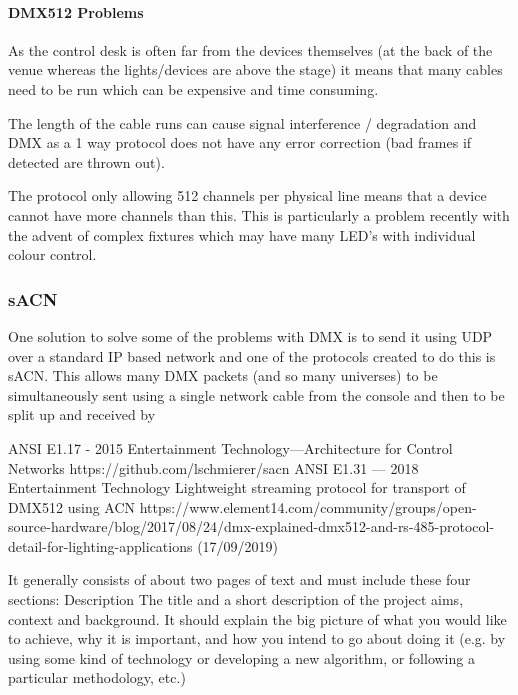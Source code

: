 \documentclass[12pt,a4paper,notitlepage]{report}
\begin{document}
\paragraph*{DMX512 Problems}
\begin{list}{}{}
	\item As the control desk is often far from the devices themselves (at the back of the venue whereas the lights/devices are above the stage) it means that many cables need to be run which can be expensive and time consuming.
	\item The length of the cable runs can cause signal interference / degradation and DMX as a 1 way protocol does not have any error correction (bad frames if detected are thrown out).
	\item The protocol only allowing 512 channels per physical line means that a device cannot have more channels than this. This is particularly a problem recently with the advent of complex fixtures which may have many LED's with individual colour control.
\end{list}

\subsubsection*{sACN}
One solution to solve some of the problems with DMX is to send it using UDP over a standard IP based network and one of the protocols created to do this is sACN. This allows many DMX packets (and so many universes) to be simultaneously sent using a single network cable from the console and then to be split up and received by 

	
\begin{thebibliography}{9}
	ANSI E1.17 - 2015 Entertainment Technology—Architecture for Control Networks
	https://github.com/lschmierer/sacn
	ANSI E1.31 — 2018 Entertainment Technology Lightweight streaming protocol for transport of DMX512 using ACN
	https://www.element14.com/community/groups/open-source-hardware/blog/2017/08/24/dmx-explained-dmx512-and-rs-485-protocol-detail-for-lighting-applications (17/09/2019)
	
\end{thebibliography}
	
	
 It
generally consists of about two pages of text and must include these four sections:
Description
The title and a short description of the project aims,
context and background. It should explain the big
picture of what you would like to achieve, why it is
important, and how you intend to go about doing it (e.g.
by using some kind of technology or developing a new
algorithm, or following a particular methodology, etc.)
\end{document}
